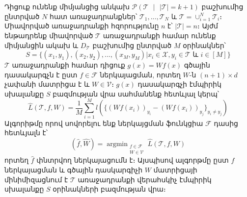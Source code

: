 \documentclass[11pt]{article}
\DeclareMathOperator*{\argmin}{argmin}
\begin{document}
Դիցուք ունենք միմյանցից անկախ $\mathcal{P}(\mathcal{T} \text{ } |\text{ }  |\mathcal{T}| = k +1)$ բաշխումից ընտրված $N$ հատ առաջադրանքներ՝ $\mathcal{T}_1, ..., \mathcal{T}_N$  և $\mathcal{T} = \cup_{i=1}^N{\mathcal{T}_i}$։ Միավորված առաջադրանքի հզորությունը $n$ է՝  $|\mathcal{T}| =n $։ Այժմ ենթադրենք միավորված $\mathcal{T}$ առաջադրանքի համար ունենք միմյանցին ակախ և $D_{\mathcal{T}}$ բաշխումից ընտրված $M$ օրինակներ՝
$$S = \{(x_1, y_1), (x_2, y_2), ..., (x_M, y_M) | x_i \in \mathcal{X}, y_i \in \mathcal{T} \text{ և } i \in [M] \}$$
$\mathcal{T}$   առաջադրանքի համար դիցուք $g(x) = Wf(x)$ գծային դասակարգչն է ըստ $f \in \mathcal{F}$ ներկայացման, որտեղ $W$-ն $(n+1) \times d$ չափանի մատրիցա է և $W \in \mathcal{V}$։ $g(x)$ դասակարգչի էմպիրիկ սխալանքը $S$ բազմության վրա սահմանենք հետևյալ կերպ՝
$$\hat{L}(\mathcal{T},f, W) = \frac{1}{M}\sum_{i=1}^Ml(\{(Wf(x_i))_{y_i} - (Wf(x_i))_{y_j}\}_{y_i \neq y_j})$$ 
Ալգորիթմը որով սովորելու ենք ներկայցման ֆունկցիա $\mathcal{F}$ դասից հետևյալն է՝
$$(\hat{f}, \hat{W}) = \argmin_{\substack{f \in \mathcal{F} \\ W \in \mathcal{V}}} \hat{L}(\mathcal{T},f, W)$$
որտեղ $\hat{f}$ փնտրվող ներկայացումն է։ Այսպիսով ալգորթմը ըստ $f$ ներկայացման և գծային դասկարգիչի $W$ մատրիցայի  մինիմիզացնում է $\mathcal{T}$ առաջադրանքի վերահսկիչ էմպիրիկ սխալանքը $S$ օրինակների բազմության վրա։
\end{document}
